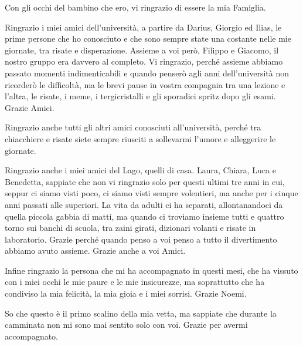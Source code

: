 \begin{dedication}
  Con gli occhi del bambino che ero, vi ringrazio di essere la mia Famiglia.

  \vspace{1cm}


  Ringrazio i miei amici dell'università, a partire da Darius, Giorgio ed Ilias, le prime persone che ho conosciuto e che sono sempre state una costante nelle mie giornate, tra risate e disperazione. Assieme a voi però, Filippo e Giacomo, il nostro gruppo era davvero al completo. Vi ringrazio, perché assieme abbiamo passato momenti indimenticabili e quando penserò agli anni dell'università non ricorderò le difficoltà, ma le brevi pause in vostra compagnia tra una lezione e l'altra, le risate, i meme, i tergicristalli e gli sporadici spritz dopo gli esami. Grazie Amici.

  Ringrazio anche tutti gli altri amici conosciuti all'università, perché tra chiacchiere e risate siete sempre riusciti a sollevarmi l'umore e alleggerire le giornate.

  Ringrazio anche i miei amici del Lago, quelli di casa. Laura, Chiara, Luca e Benedetta, sappiate che non vi ringrazio solo per questi ultimi tre anni in cui, seppur ci siamo visti poco, ci siamo visti sempre volentieri, ma anche per i cinque anni passati alle superiori. La vita da adulti ci ha separati, allontanandoci da quella piccola gabbia di matti, ma quando ci troviamo insieme tutti e quattro torno sui banchi di scuola, tra zaini girati, dizionari volanti e risate in laboratorio. Grazie perché quando penso a voi penso a tutto il divertimento abbiamo avuto assieme. Grazie anche a voi Amici.
  
  
  Infine ringrazio la persona che mi ha accompagnato in questi mesi, che ha vissuto con i miei occhi le mie paure e le mie insicurezze, ma soprattutto che ha condiviso la mia felicità, la mia gioia e i miei sorrisi. Grazie Noemi.

  
  \vspace{1cm}
  
  So che questo è il primo scalino della mia vetta, ma sappiate che durante la camminata non mi sono mai sentito solo con voi. Grazie per avermi accompagnato. 
\end{dedication}
